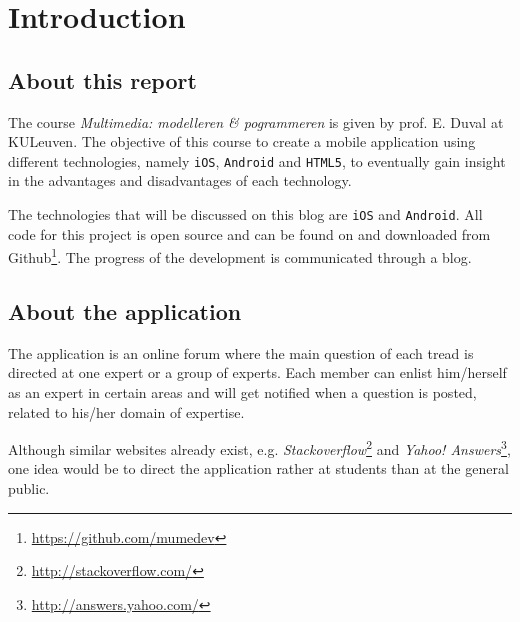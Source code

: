 \chapter{Introduction}

\section{About this report}

The course \emph{Multimedia: modelleren \& pogrammeren} is given by prof. E. Duval at KULeuven. The objective of this course to create a mobile application using different technologies, namely \texttt{iOS}, \texttt{Android} and \texttt{HTML5}, to eventually gain insight in the advantages and disadvantages of each technology.

The technologies that will be discussed on this blog are \texttt{iOS} and \texttt{Android}. All code for this project is open source and can be found on and downloaded from Github\footnote{\url{https://github.com/mumedev}}. The progress of the development is communicated through a blog.


\section{About the application}

The application is an online forum where the main question of each tread is directed at one expert or a group of experts. Each member can enlist him/herself as an expert in certain areas and will get notified when a question is posted, related to his/her domain of expertise.


Although similar websites already exist, e.g. \emph{Stackoverflow}\footnote{\url{http://stackoverflow.com/}} and \emph{Yahoo! Answers}\footnote{\url{http://answers.yahoo.com/}}, one idea would be to direct the application rather at students than at the general public.
